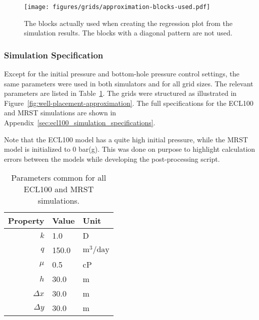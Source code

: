 \begin{figure}[H]
    \centering
    \texttt{[image: figures/grids/approximation-blocks-used.pdf]}
    \caption{The blocks actually used when creating the regression plot from the simulation results. The blocks with a diagonal pattern are not used.}
    \label{fig:blocks-used}
\end{figure}

\subsubsection{Simulation Specification} %
\label{ssub:simulation_specification}
Except for the initial pressure and bottom-hole pressure control settings, the same parameters were used in both simulators and for all grid sizes. The relevant parameters are listed in Table~\ref{tbl:simulation-parameters}. The grids were structured as illustrated in Figure~\ref{fig:well-placement-approximation}. The full specifications for the ECL100 and MRST simulations are shown in Appendix~\ref{sec:ecl100_simulation_specifications}.

Note that the ECL100 model has a quite high initial pressure, while the MRST model is initialized to 0 bar(g). This was done on purpose to highlight calculation errors between the models while developing the post-processing script.

\begin{table}[H]
    \caption{Parameters common for all ECL100 and MRST simulations.}
    \centering
    \begin{tabular}{rll}
        \toprule
        Property & Value & Unit \\
        \midrule
        $k$        & 1.0   & D                           \\
        $q$        & 150.0 & $\mathrm{m}^3/\mathrm{day}$ \\
        $\mu$      & 0.5   & cP                          \\
        $h$        & 30.0  & m                           \\
        $\Delta x$ & 30.0  & m                           \\
        $\Delta y$ & 30.0  & m                           \\
        \bottomrule
    \end{tabular}
    \label{tbl:simulation-parameters}
\end{table}


